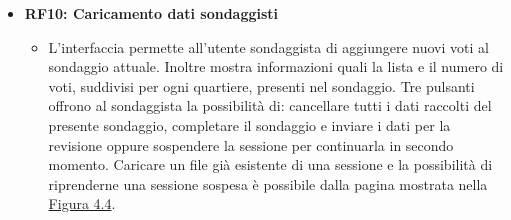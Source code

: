     \begin{itemize}
        \item \textbf{RF10: Caricamento dati sondaggisti} \begin{itemize}
            \item L'interfaccia permette all'utente sondaggista di aggiungere nuovi voti al sondaggio attuale. Inoltre mostra informazioni quali la lista e il numero di voti, suddivisi per ogni quartiere, presenti nel sondaggio. Tre pulsanti offrono al sondaggista la possibilità di: cancellare tutti i dati raccolti del presente sondaggio, completare il sondaggio e inviare i dati per la revisione oppure sospendere la sessione per continuarla in secondo momento. Caricare un file già esistente di una sessione e la possibilità di riprenderne una sessione sospesa è possibile dalla pagina mostrata nella \hyperref[fig:4.4]{Figura 4.4}.
        \end{itemize}
    \end{itemize}
    